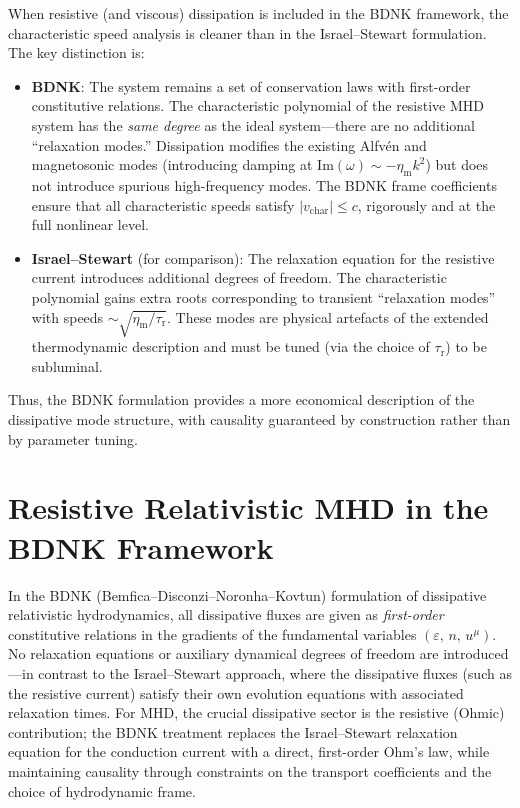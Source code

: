 When resistive (and viscous) dissipation is included in the BDNK
framework, the characteristic speed analysis is cleaner than in the
Israel--Stewart formulation.  The key distinction is:
\begin{itemize}
  \item \textbf{BDNK}: The system remains a set of conservation laws
        with first-order constitutive relations.  The characteristic
        polynomial of the resistive MHD system has the \emph{same
        degree} as the ideal system---there are no additional
        ``relaxation modes.''  Dissipation modifies the existing
        Alfv\'en and magnetosonic modes (introducing damping at
        $\mathrm{Im}(\omega)\sim -\eta_{\mathrm{m}}k^{2}$) but does
        not introduce spurious high-frequency modes.  The BDNK frame
        coefficients ensure that all characteristic speeds satisfy
        $|v_{\mathrm{char}}| \le c$, rigorously and at the full
        nonlinear level.
  \item \textbf{Israel--Stewart} (for comparison): The relaxation
        equation for the resistive current introduces additional
        degrees of freedom.  The characteristic polynomial gains extra
        roots corresponding to transient ``relaxation modes'' with
        speeds $\sim\!\sqrt{\eta_{\mathrm{m}}/\tau_{\mathrm{r}}}$.
        These modes are physical artefacts of the extended
        thermodynamic description and must be tuned (via the choice of
        $\tau_{\mathrm{r}}$) to be subluminal.
\end{itemize}
Thus, the BDNK formulation provides a more economical description of
the dissipative mode structure, with causality guaranteed by
construction rather than by parameter tuning.


\section{Resistive Relativistic MHD in the BDNK Framework}
\label{sec:resistive-rmhd}

In the BDNK (Bemfica--Disconzi--Noronha--Kovtun) formulation of
dissipative relativistic hydrodynamics, all dissipative fluxes are
given as \emph{first-order} constitutive relations in the gradients
of the fundamental variables $(\varepsilon,\,n,\,u^{\mu})$.  No
relaxation equations or auxiliary dynamical degrees of freedom are
introduced---in contrast to the Israel--Stewart approach, where the
dissipative fluxes (such as the resistive current) satisfy their own
evolution equations with associated relaxation times.  For MHD, the
crucial dissipative sector is the resistive (Ohmic) contribution; the
BDNK treatment replaces the Israel--Stewart relaxation equation for
the conduction current with a direct, first-order Ohm's law, while
maintaining causality through constraints on the transport coefficients
and the choice of hydrodynamic frame.

